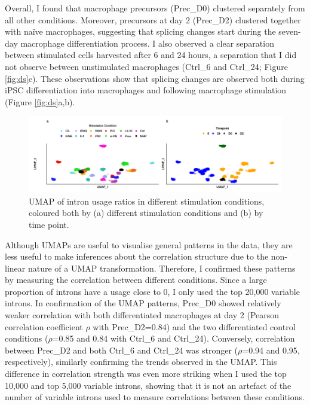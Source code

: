 Overall, I found that macrophage precursors (Prec\_D0) clustered separately from all other conditions. Moreover, precursors at day 2 (Prec\_D2) clustered together with naïve macrophages, suggesting that splicing changes start during the seven-day macrophage differentiation process. I also observed a clear separation between stimulated cells harvested after 6 and 24 hours, a separation that I did not observe between unstimulated macrophages (Ctrl\_6 and Ctrl\_24; Figure \ref{fig:ds}c). These observations show that splicing changes are observed both during iPSC differentiation into macrophages and following macrophage stimulation (Figure \ref{fig:ds}a,b). \\



\begin{figure}[H]
  \centering
  \includegraphics[width=\textwidth]{Vector/umap.png}
  \caption[UMAP of intron usage ratios in different stimulation conditions and timepoints]{ UMAP of intron usage ratios in different stimulation conditions, coloured both by (a) different stimulation conditions and (b) by time point.}
  \label{fig:umap}   
\end{figure}
Although UMAPs are useful to visualise general patterns in the data, they are less useful to make inferences about the correlation structure due to the non-linear nature of a UMAP transformation. Therefore, I confirmed these patterns by measuring the correlation between different conditions. Since a large proportion of introns have a usage close to 0, I only used the top 20,000 variable introns. In confirmation of the UMAP patterns, Prec\_D0 showed relatively weaker correlation with both differentiated macrophages at day 2 (Pearson correlation coefficient $\rho$ with Prec\_D2=0.84) and the two differentiated control conditions ($\rho$=0.85 and 0.84 with Ctrl\_6 and Ctrl\_24). Conversely, correlation between Prec\_D2 and both Ctrl\_6 and Ctrl\_24 was stronger ($\rho$=0.94 and 0.95, respectively), similarly confirming the trends observed in the UMAP. This difference in correlation strength was even more striking when I used the top 10,000 and top 5,000 variable introns, showing that it is not an artefact of the number of variable introns used to measure correlations between these conditions.\\

